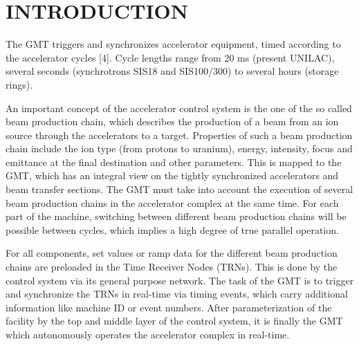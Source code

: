 \section{INTRODUCTION}

The GMT triggers and synchronizes accelerator equipment, 
timed according to the accelerator cycles [4]. Cycle lengths range 
from 20 ms (present UNILAC), several seconds (synchrotrons SIS18 
and SIS100/300) to several hours (storage rings). 

An important concept of the accelerator control system 
is the one of the so called beam production chain, which describes the production of a beam
from an ion source through the accelerators to a target. Properties of such a beam production 
chain include the ion type (from protons to uranium), energy, intensity, focus
and emittance at the final destination and other parameters. This is mapped to the GMT, which 
has an integral view on the tightly synchronized accelerators and beam transfer
sections. The GMT must take into account the execution of several beam production 
chains in the accelerator complex at the same time. For each part of the machine, switching 
between different beam production chains will be possible between cycles, which implies a 
high degree of true parallel operation.

For all components, set values or ramp data for the different beam production chains are 
preloaded in the Time Receiver Nodes (TRNs). This is done by the control system
via its general purpose network. The task of the GMT is to trigger and synchronize the 
TRNs in real-time via timing events, which carry additional information like machine ID
or event numbers. After parameterization of the facility by the top and middle layer of 
the control system, it is finally the GMT which autonomously operates the accelerator 
complex in real-time.



